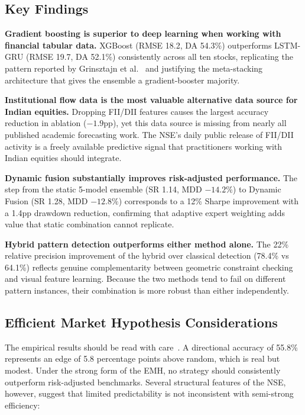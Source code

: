 \documentclass[10pt,a4paper,twoside]{article}
\begin{document}
\subsection{Key Findings}

\textbf{Gradient boosting is superior to deep learning when working with financial tabular data.}
XGBoost (RMSE 18.2, DA 54.3\%) outperforms LSTM-GRU (RMSE 19.7, DA 52.1\%)
consistently across all ten stocks, replicating the pattern reported by
Grinsztajn et al.~\cite{grinsztajn2022} and justifying the meta-stacking
architecture that gives the ensemble a gradient-booster majority.

\textbf{Institutional flow data is the most valuable alternative data source
for Indian equities.} Dropping FII/DII features causes the largest accuracy
reduction in ablation ($-1.9$pp), yet this data source is missing from nearly
all published academic forecasting work. The NSE's daily public release of
FII/DII activity is a freely available predictive signal that practitioners
working with Indian equities should integrate.

\textbf{Dynamic fusion substantially improves risk-adjusted performance.}
The step from the static 5-model ensemble (SR 1.14, MDD $-14.2\%$) to Dynamic
Fusion (SR 1.28, MDD $-12.8\%$) corresponds to a 12\% Sharpe improvement with
a 1.4pp drawdown reduction, confirming that adaptive expert weighting adds
value that static combination cannot replicate.

\textbf{Hybrid pattern detection outperforms either method alone.}
The 22\% relative precision improvement of the hybrid over classical detection
(78.4\% vs 64.1\%) reflects genuine complementarity between geometric constraint
checking and visual feature learning. Because the two methods tend to fail on
different pattern instances, their combination is more robust than either
independently.

\subsection{Efficient Market Hypothesis Considerations}

The empirical results should be read with care~\cite{fama1970}. A directional
accuracy of 55.8\% represents an edge of 5.8 percentage points above random,
which is real but modest. Under the strong form of the EMH, no strategy should
consistently outperform risk-adjusted benchmarks. Several structural features
of the NSE, however, suggest that limited predictability is not inconsistent
with semi-strong efficiency:
\end{document}
